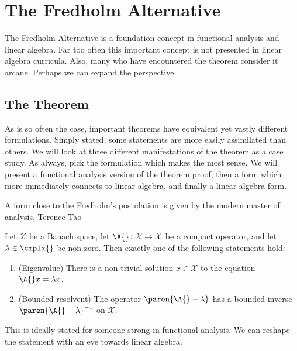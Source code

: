 \section{The Fredholm Alternative}
The Fredholm Alternative is a foundation concept in functional analysis and linear algebra. Far too often this important concept is not presented in linear algebra 
curricula. Also, many who have encountered the theorem consider it arcane. Perhaps we can expand the perspective.

\subsection{The Theorem}
As is so often the case, important theorems have equivalent yet vastly different formulations. Simply stated, some statements are more easily assimilated than others. We will look at three different manifestations of the theorem as a case study. As always, pick the formulation which makes the most sense. We will present a functional analysis version of the theorem proof, then a form which more immediately connects to linear algebra, and finally a linear algebra form.

A form close to the Fredholm's postulation is given by the modern master of analysis, Terence Tao
\begin{thm}
Let $\mathcal{X}$ be a Banach space, let $\A{}\colon \mathcal{X} \to \mathcal{X}$ be a compact operator, and let $\lambda \in\cmplx{}$ be non-zero. Then exactly one of the following statements hold:
\begin{enumerate}
\item (Eigenvalue) There is a non-trivial solution $x\in\mathcal{X}$ to the equation $\A{} x = \lambda x$.
\item (Bounded resolvent) The operator $\paren{\A{} - \lambda}$ has a bounded inverse $\paren{\A{} - \lambda}^{-1}$ on $\mathcal{X}$.
\end{enumerate}
\label{thm:fredholm1}
\end{thm}

This is ideally stated for someone strong in functional analysis. We can reshape the statement with an eye towards linear algebra.

